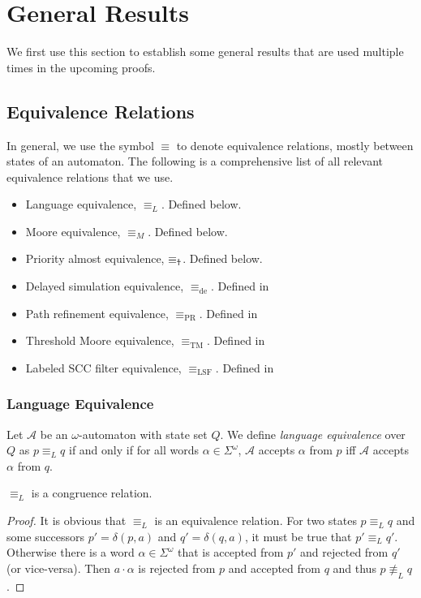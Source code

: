 \section{General Results}
We first use this section to establish some general results that are used multiple times in the upcoming proofs.

\subsection{Equivalence Relations}

In general, we use the symbol $\equiv$ to denote equivalence relations, mostly between states of an automaton. The following is a comprehensive list of all relevant equivalence relations that we use.

\begin{itemize}
	\item Language equivalence, $\equiv_L$. Defined below.
	\item Moore equivalence, $\equiv_M$. Defined below.
	\item Priority almost equivalence, $\equiv_\text{\Ankh}$. Defined below.
	\item Delayed simulation equivalence, $\equiv_\text{de}$. Defined in %
	\item Path refinement equivalence, $\equiv_\text{PR}$. Defined in %
	\item Threshold Moore equivalence, $\equiv_\text{TM}$. Defined in %
	\item Labeled SCC filter equivalence, $\equiv_\text{LSF}$. Defined in %
\end{itemize}


\subsubsection{Language Equivalence}

\begin{defn}
	Let $\mathcal{A}$ be an $\omega$-automaton with state set $Q$. We define \emph{language equivalence} over $Q$ as $p \equiv_L q$ if and only if for all words $\alpha \in \Sigma^\omega$, $\mathcal{A}$ accepts $\alpha$ from $p$ iff $\mathcal{A}$ accepts $\alpha$ from $q$.
\end{defn}

\begin{lem}
	$\equiv_L$ is a congruence relation.
\end{lem}

\begin{proof}
	It is obvious that $\equiv_L$ is an equivalence relation. For two states $p \equiv_L q$ and some successors $p' = \delta(p, a)$ and $q' = \delta(q, a)$, it must be true that $p' \equiv_L q'$. Otherwise there is a word $\alpha \in \Sigma^\omega$ that is accepted from $p'$ and rejected from $q'$ (or vice-versa). Then $a \cdot \alpha$ is rejected from $p$ and accepted from $q$ and thus $p \not\equiv_L q$.
\end{proof}


